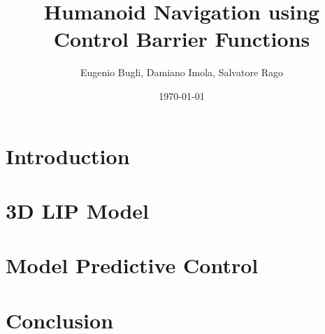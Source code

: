 \documentclass[12pt]{article}
\title{Humanoid Navigation using Control Barrier Functions}
\author{Eugenio Bugli, Damiano Imola, Salvatore Rago}
\date{\today} %
\begin{document}
\setlength{\parindent}{0pt}

\maketitle
\tableofcontents
\section{Introduction} 
\section{3D LIP Model} 
\section{Model Predictive Control} 
\section{Conclusion} 
\end{document}
